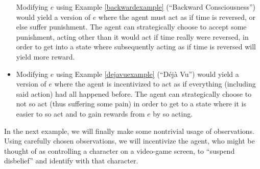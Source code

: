 \documentclass[runningheads]{llncs}
\begin{document}
\begin{example}
\begin{itemize}
        Modifying $e$ using Example \ref{backwardexample}
        (``Backward Consciousness'') would yield a version of $e$
        where the agent must act as if time is reversed, or else suffer punishment.
        The agent can strategically choose to accept some punishment, acting other
        than it would act if time really were reversed, in order to get into a state
        where subsequently acting as if time is reversed will yield more reward.
        \item
        Modifying $e$ using Example \ref{dejavuexample} (``D\'{e}j\`{a} Vu'')
        would yield a version of $e$ where the agent is incentivized
        to act as if
        everything (including said action) had all happened before.
        The agent can strategically choose to not so act (thus suffering some
        pain) in order to get to a state where it is easier to so act and
        to gain rewards from $e$ by so acting.
    \end{itemize}
\end{example}

In the next example,
we will finally make some nontrivial usage of observations. Using carefully chosen
observations, we will incentivize the agent, who might be thought of as
controlling a character on a video-game screen,
to ``suspend disbelief'' and identify with that character.
\end{document}
